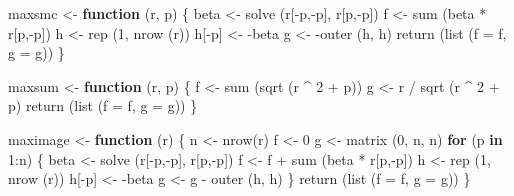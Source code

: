 \documentclass[
  12pt,
]{book}
\newenvironment{Shaded}{\begin{snugshade}}{\end{snugshade}}
\newcommand{\AttributeTok}[1]{\textcolor[rgb]{0.77,0.63,0.00}{#1}}
\newcommand{\ControlFlowTok}[1]{\textcolor[rgb]{0.13,0.29,0.53}{\textbf{#1}}}
\newcommand{\DecValTok}[1]{\textcolor[rgb]{0.00,0.00,0.81}{#1}}
\newcommand{\FunctionTok}[1]{\textcolor[rgb]{0.00,0.00,0.00}{#1}}
\newcommand{\NormalTok}[1]{#1}
\newcommand{\OtherTok}[1]{\textcolor[rgb]{0.56,0.35,0.01}{#1}}
\newcommand{\SpecialCharTok}[1]{\textcolor[rgb]{0.00,0.00,0.00}{#1}}
\begin{document}
\begin{Shaded}
\begin{Highlighting}[]
\NormalTok{maxsmc }\OtherTok{\textless{}{-}} \ControlFlowTok{function}\NormalTok{ (r, p) \{}
\NormalTok{  beta }\OtherTok{\textless{}{-}} \FunctionTok{solve}\NormalTok{ (r[}\SpecialCharTok{{-}}\NormalTok{p,}\SpecialCharTok{{-}}\NormalTok{p], r[p,}\SpecialCharTok{{-}}\NormalTok{p])}
\NormalTok{  f }\OtherTok{\textless{}{-}} \FunctionTok{sum}\NormalTok{ (beta }\SpecialCharTok{*}\NormalTok{ r[p,}\SpecialCharTok{{-}}\NormalTok{p])}
\NormalTok{  h }\OtherTok{\textless{}{-}} \FunctionTok{rep}\NormalTok{ (}\DecValTok{1}\NormalTok{, }\FunctionTok{nrow}\NormalTok{ (r))}
\NormalTok{  h[}\SpecialCharTok{{-}}\NormalTok{p] }\OtherTok{\textless{}{-}} \SpecialCharTok{{-}}\NormalTok{beta}
\NormalTok{  g }\OtherTok{\textless{}{-}} \SpecialCharTok{{-}}\FunctionTok{outer}\NormalTok{ (h, h)}
  \FunctionTok{return}\NormalTok{ (}\FunctionTok{list}\NormalTok{ (}\AttributeTok{f =}\NormalTok{ f, }\AttributeTok{g =}\NormalTok{ g))}
\NormalTok{\}}

\NormalTok{maxsum }\OtherTok{\textless{}{-}} \ControlFlowTok{function}\NormalTok{ (r, p) \{}
\NormalTok{  f }\OtherTok{\textless{}{-}} \FunctionTok{sum}\NormalTok{ (}\FunctionTok{sqrt}\NormalTok{ (r }\SpecialCharTok{\^{}} \DecValTok{2} \SpecialCharTok{+}\NormalTok{ p))}
\NormalTok{  g }\OtherTok{\textless{}{-}}\NormalTok{ r }\SpecialCharTok{/} \FunctionTok{sqrt}\NormalTok{ (r }\SpecialCharTok{\^{}} \DecValTok{2} \SpecialCharTok{+}\NormalTok{ p)}
  \FunctionTok{return}\NormalTok{ (}\FunctionTok{list}\NormalTok{ (}\AttributeTok{f =}\NormalTok{ f, }\AttributeTok{g =}\NormalTok{ g))}
\NormalTok{\}}

\NormalTok{maximage }\OtherTok{\textless{}{-}} \ControlFlowTok{function}\NormalTok{ (r) \{}
\NormalTok{  n }\OtherTok{\textless{}{-}} \FunctionTok{nrow}\NormalTok{(r)}
\NormalTok{  f }\OtherTok{\textless{}{-}} \DecValTok{0}
\NormalTok{  g }\OtherTok{\textless{}{-}} \FunctionTok{matrix}\NormalTok{ (}\DecValTok{0}\NormalTok{, n, n)}
  \ControlFlowTok{for}\NormalTok{ (p }\ControlFlowTok{in} \DecValTok{1}\SpecialCharTok{:}\NormalTok{n) \{}
\NormalTok{    beta }\OtherTok{\textless{}{-}} \FunctionTok{solve}\NormalTok{ (r[}\SpecialCharTok{{-}}\NormalTok{p,}\SpecialCharTok{{-}}\NormalTok{p], r[p,}\SpecialCharTok{{-}}\NormalTok{p])}
\NormalTok{    f }\OtherTok{\textless{}{-}}\NormalTok{ f }\SpecialCharTok{+} \FunctionTok{sum}\NormalTok{ (beta }\SpecialCharTok{*}\NormalTok{ r[p,}\SpecialCharTok{{-}}\NormalTok{p])}
\NormalTok{    h }\OtherTok{\textless{}{-}} \FunctionTok{rep}\NormalTok{ (}\DecValTok{1}\NormalTok{, }\FunctionTok{nrow}\NormalTok{ (r))}
\NormalTok{    h[}\SpecialCharTok{{-}}\NormalTok{p] }\OtherTok{\textless{}{-}} \SpecialCharTok{{-}}\NormalTok{beta}
\NormalTok{    g }\OtherTok{\textless{}{-}}\NormalTok{ g }\SpecialCharTok{{-}} \FunctionTok{outer}\NormalTok{ (h, h)}
\NormalTok{  \}}
  \FunctionTok{return}\NormalTok{ (}\FunctionTok{list}\NormalTok{ (}\AttributeTok{f =}\NormalTok{ f, }\AttributeTok{g =}\NormalTok{ g))}
\NormalTok{\}}


\end{Highlighting}
\end{Shaded}
\end{document}
